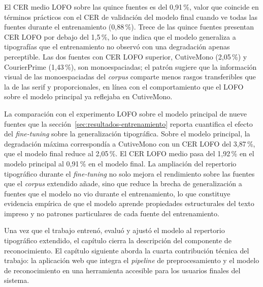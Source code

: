 El CER medio LOFO sobre las quince fuentes es del 0{,}91\,\%, valor que coincide en términos prácticos con el CER de validación del modelo final cuando ve todas las fuentes durante el entrenamiento (0{,}88\,\%). Trece de las quince fuentes presentan CER LOFO por debajo del 1{,}5\,\%, lo que indica que el modelo generaliza a tipografías que el entrenamiento no observó con una degradación apenas perceptible. Las dos fuentes con CER LOFO superior, CutiveMono (2{,}05\,\%) y CourierPrime (1{,}43\,\%), son monoespaciadas; el patrón sugiere que la información visual de las monoespaciadas del \textit{corpus} comparte menos rasgos transferibles que la de las serif y proporcionales, en línea con el comportamiento que el LOFO sobre el modelo principal ya reflejaba en CutiveMono.

La comparación con el experimento LOFO sobre el modelo principal de nueve fuentes que la sección~\ref{sec:resultados-entrenamiento} reporta cuantifica el efecto del \textit{fine-tuning} sobre la generalización tipográfica. Sobre el modelo principal, la degradación máxima correspondía a CutiveMono con un CER LOFO del 3{,}87\,\%, que el modelo final reduce al 2{,}05\,\%. El CER LOFO medio pasa del 1{,}92\,\% en el modelo principal al 0{,}91\,\% en el modelo final. La ampliación del repertorio tipográfico durante el \textit{fine-tuning} no solo mejora el rendimiento sobre las fuentes que el \textit{corpus} extendido añade, sino que reduce la brecha de generalización a fuentes que el modelo no vio durante el entrenamiento, lo que constituye evidencia empírica de que el modelo aprende propiedades estructurales del texto impreso y no patrones particulares de cada fuente del entrenamiento.


Una vez que el trabajo entrenó, evaluó y ajustó el modelo al repertorio tipográfico extendido, el capítulo cierra la descripción del componente de reconocimiento. El capítulo siguiente aborda la cuarta contribución técnica del trabajo: la aplicación web que integra el \textit{pipeline} de preprocesamiento y el modelo de reconocimiento en una herramienta accesible para los usuarios finales del sistema.
